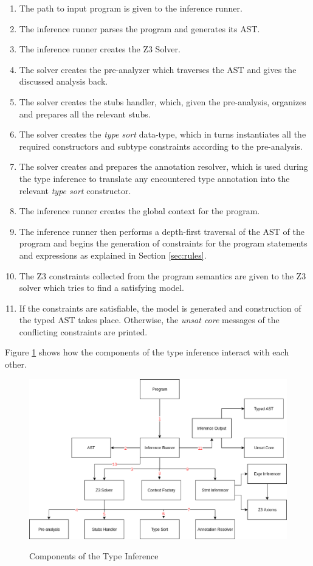 \begin{enumerate}
	\item The path to input program is given to the inference runner.
	\item The inference runner parses the program and generates its AST.
	\item The inference runner creates the Z3 Solver.
	\item The solver creates the pre-analyzer which traverses the AST and gives the discussed analysis back.
	\item The solver creates the stubs handler, which, given the pre-analysis, organizes and prepares all the relevant stubs.
	\item The solver creates the \textit{type sort} data-type, which in turns instantiates all the required constructors and subtype constraints according to the pre-analysis.
	\item The solver creates and prepares the annotation resolver, which is used during the type inference to translate any encountered type annotation into the relevant \textit{type sort} constructor.
	\item The inference runner creates the global context for the program.
	\item The inference runner then performs a depth-first traversal of the AST of the program and begins the generation of constraints for the program statements and expressions as explained in Section \ref{sec:rules}.
	\item The Z3 constraints collected from the program semantics are given to the Z3 solver which tries to find a satisfying model.
	\item If the constraints are satisfiable, the model is generated and construction of the typed AST takes place. Otherwise, the \textit{unsat core} messages of the conflicting constraints are printed.
\end{enumerate}
Figure \ref{fig:ti_comp} shows how the components of the type inference interact with each other.

\begin{figure}
	\centering
	\begin{mdframed}
		\centering
		\includegraphics[width=130mm]{images/TI_comp.eps}\\
	\end{mdframed}
	\caption{Components of the Type Inference}
	\label{fig:ti_comp}
\end{figure}

